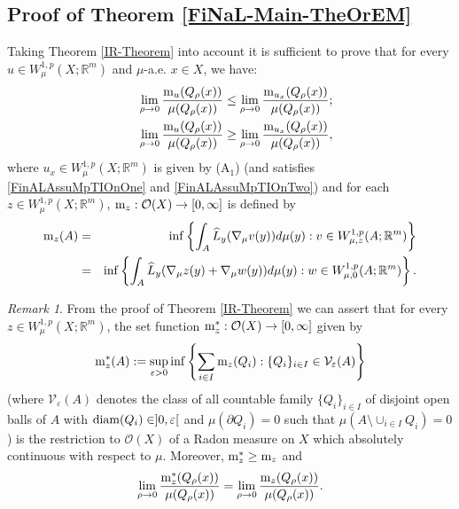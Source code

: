 \documentclass[10pt]{amsart}
\numberwithin{equation}{section}
\theoremstyle{definition}
\theoremstyle{remark}
\newtheorem{remark}[theorem]{Remark}
\begin{document}
\subsection{Proof of Theorem \ref{FiNaL-Main-TheOrEM}} Taking Theorem \ref{IR-Theorem} into account it is sufficient to prove that for every $u\in W^{1,p}_\mu(X;{{\mathbb R}}^m)$ and $\mu$-a.e. $x\in X$, we have:
\begin{eqnarray}
&&\lim_{\rho\to0}{{\rm m}_u(Q_\rho(x))\over\mu(Q_\rho(x))}\leq\lim_{\rho\to0}{{\rm m}_{u_x}(Q_\rho(x))\over\mu(Q_\rho(x))};\label{FiNaL-EqUa1}\\
&&\lim_{\rho\to0}{{\rm m}_u(Q_\rho(x))\over\mu(Q_\rho(x))}\geq\lim_{\rho\to0}{{\rm m}_{u_x}(Q_\rho(x))\over\mu(Q_\rho(x))},\label{FiNaL-EqUa2}
\end{eqnarray}
where $u_x\in W^{1,p}_\mu(X;{{\mathbb R}}^m)$ is given by (A$_1$) (and satisfies \eqref{FinALAssuMpTIOnOne} and \eqref{FinALAssuMpTIOnTwo}) and for each $z\in W^{1,p}_\mu(X;{{\mathbb R}}^m)$, ${\rm m}_z:\mathcal{O}(X)\to[0,\infty]$ is defined by
\begin{eqnarray*}
{\rm m}_z(A)&=&\inf\left\{\int_{A}\widehat{L}_y(\nabla_\mu v(y))d\mu(y):v\in W^{1,p}_{\mu,z}(A;{{\mathbb R}}^m)\right\}\\
&=&\inf\left\{\int_{A}\widehat{L}_y(\nabla_\mu z(y)+\nabla_\mu w(y))d\mu(y):w\in W^{1,p}_{\mu,0}(A;{{\mathbb R}}^m)\right\}.
\end{eqnarray*}
\begin{remark}\label{ReMarK-FiNAl-PrOOf-TheorEM}
From the proof of Theorem \ref{IR-Theorem} we can assert that for every $z\in W^{1,p}_\mu(X;{{\mathbb R}}^m)$, the set function ${\rm m}^*_z:\mathcal{O}(X)\to[0,\infty]$ given by 
$$
{\rm m}^*_z(A):=\sup_{{\varepsilon}>0}\inf\left\{\sum_{i\in I}{\rm m}_z(Q_i):\{Q_i\}_{i\in I}\in \mathcal{V}_{\varepsilon}(A)\right\}
$$
(where $\mathcal{V}_{\varepsilon}(A)$ denotes the class of all countable family $\{Q_i\}_{i\in I}$ of disjoint open balls of $A$ with ${\rm diam}(Q_i)\in]0,{\varepsilon}[$ and $\mu(\partial Q_i)=0$ such that $\mu(A\setminus\cup_{i\in I}Q_i)=0$) is the restriction to $\mathcal{O}(X)$ of a Radon measure on $X$ which absolutely continuous with respect to $\mu$. Moreover, ${\rm m}^*_z\geq{\rm m}_z$ and
\begin{equation}\label{FiNalRemarKEquatION}
\lim_{\rho\to0}{{\rm m}_z^*(Q_\rho(x))\over\mu(Q_\rho(x))}=\lim_{\rho\to 0}{{\rm m}_z(Q_\rho(x))\over\mu(Q_\rho(x))}.
\end{equation}
\end{remark}
\end{document}

